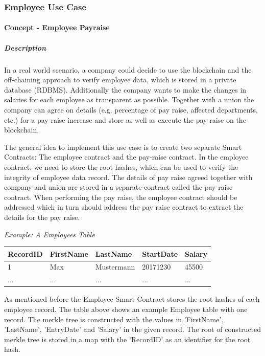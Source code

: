 \subsubsection{Employee Use Case}
\paragraph{Concept - Employee Payraise}
\subparagraph{Description}
In a real world scenario, a company could decide to use the blockchain and the off-chaining approach to verify employee data, which is stored in a private database (RDBMS). Additionally the company wants to make the changes in salaries for each employee as transparent as possible. Together with a union the company can agree on details (e.g. percentage of pay raise, affected departments, etc.) for a pay raise increase and store as well as execute the pay raise on the blockchain.

The general idea to implement this use case is to create two separate Smart Contracts: The employee contract and the pay-raise contract. In the employee contract, we need to store the root hashes, which can be used to verify the integrity of employee data record. The details of pay raise agreed together with company and union are stored in a separate contract called the pay raise contract. When performing the pay raise, the employee contract should be addressed which in turn should address the pay raise contract to extract the details for the pay raise.


\textit{Example: A Employees Table}
\begin{center}
    \begin{tabular}{| l | l | l | l | l |}
    \hline
    RecordID & FirstName & LastName & StartDate & Salary \\ \hline
    1 & Max & Mustermann & 20171230 & 45500 \\ \hline
    ... & ... & ... & ... & ... \\ \hline
    \end{tabular}
\end{center}

As mentioned before the Employee Smart Contract stores the root hashes of each employee record. The table above shows an example Employee table with one record. The merkle tree is constructed with the values in 'FirstName', 'LastName', 'EntryDate' and 'Salary' in the given record. The root of constructed merkle tree is stored in a map with the 'RecordID' as an identifier for the root hash.

